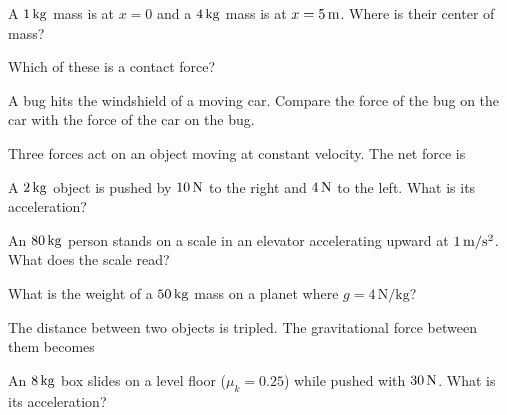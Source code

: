 \begin{exo}{}
A $1\,\mathrm{kg}$ mass is at $x=0$ and a $4\,\mathrm{kg}$ mass is at $x=5\,\mathrm{m}$. Where is their center of mass?
\end{exo}
\begin{exo}{}
Which of these is a contact force?
\end{exo}
\begin{exo}{}
A bug hits the windshield of a moving car. Compare the force of the bug on the car with the force of the car on the bug.
\end{exo}
\begin{exo}{}
Three forces act on an object moving at constant velocity. The net force is
\end{exo}
\begin{exo}{}
A $2\,\mathrm{kg}$ object is pushed by $10\,\mathrm{N}$ to the right and $4\,\mathrm{N}$ to the left. What is its acceleration?
\end{exo}
\begin{exo}{}
An $80\,\mathrm{kg}$ person stands on a scale in an elevator accelerating upward at $1\,\mathrm{m/s^2}$. What does the scale read?
\choices{$800\N$}{$720\N$}{$880\N$}{$80\N$}
\end{exo}
\begin{exo}{}
What is the weight of a $50\,\mathrm{kg}$ mass on a planet where $g=4\,\mathrm{N/kg}$?
\choices{$500\N$}{$200\N$}{$12.5\N$}{$50\N$}
\end{exo}
\begin{exo}{}
The distance between two objects is tripled. The gravitational force between them becomes
\end{exo}
\begin{exo}{}
An $8\,\mathrm{kg}$ box slides on a level floor ($\mu_k=0.25$) while pushed with $30\,\mathrm{N}$. What is its acceleration?
\end{exo}
